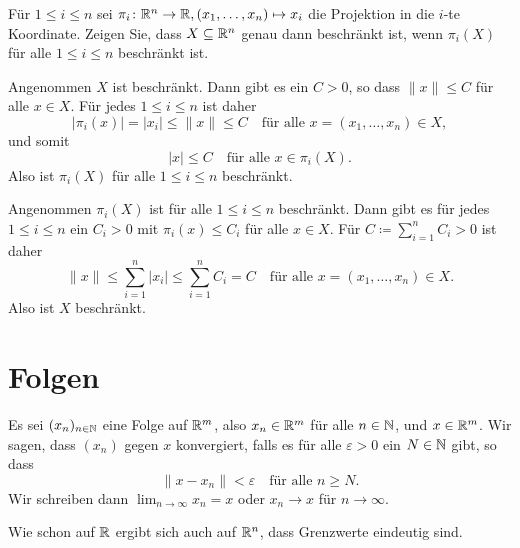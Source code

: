\documentclass[a4paper,10pt]{article}
\begin{document}
\begin{question}\label{qst: Beschränktheit in Koordinaten}
 Für $1 \leq i \leq n$ sei $\pi_i \colon \mathbb{R}^n \to \mathbb{R}, (x_1, \dotsc, x_n) \mapsto x_i$ die Projektion in die $i$-te Koordinate. Zeigen Sie, dass $X \subseteq \mathbb{R}^n$ genau dann beschränkt ist, wenn $\pi_i(X)$ für alle $1 \leq i \leq n$ beschränkt ist.
\end{question}
\begin{solution}
 Angenommen $X$ ist beschränkt. Dann gibt es ein $C > 0$, so dass $\|x\| \leq C$ für alle $x \in X$. Für jedes $1 \leq i \leq n$ ist daher
 \[
  |\pi_i(x)| = |x_i| \leq \|x\| \leq C \quad \text{für alle $x = (x_1, \dotsc, x_n) \in X$},
 \]
 und somit
 \[
  |x| \leq C \quad \text{für alle $x \in \pi_i(X)$}.
 \]
 Also ist $\pi_i(X)$ für alle $1 \leq i \leq n$ beschränkt.
 
 Angenommen $\pi_i(X)$ ist für alle $1 \leq i \leq n$ beschränkt. Dann gibt es für jedes $1 \leq i \leq n$ ein $C_i > 0$ mit $\pi_i(x) \leq C_i$ für alle $x \in X$. Für $C \coloneqq \sum_{i=1}^n C_i > 0$ ist daher
 \[
  \|x\| \leq \sum_{i=1}^n |x_i| \leq \sum_{i=1}^n C_i = C
  \quad \text{für alle $x = (x_1, \dotsc, x_n) \in X$}.
 \]
 Also ist $X$ beschränkt.
\end{solution}





\section{Folgen}


\begin{defi}
 Es sei $(x_n)_{n \in \mathbb{N}}$ eine Folge auf $\mathbb{R}^m$, also $x_n \in \mathbb{R}^m$ für alle $n \in \mathbb{N}$, und $x \in \mathbb{R}^m$. Wir sagen, dass $(x_n)$ gegen $x$ konvergiert, falls es für alle $\varepsilon > 0$ ein $N \in \mathbb{N}$ gibt, so dass
 \[
  \|x - x_n\| < \varepsilon \quad \text{für alle $n \geq N$}.
 \]
 Wir schreiben dann $\lim_{n \to \infty} x_n = x$ oder $x_n \to x$ für $n \to \infty$.
\end{defi}


Wie schon auf $\mathbb{R}$ ergibt sich auch auf $\mathbb{R}^n$, dass Grenzwerte eindeutig sind.
\end{document}
